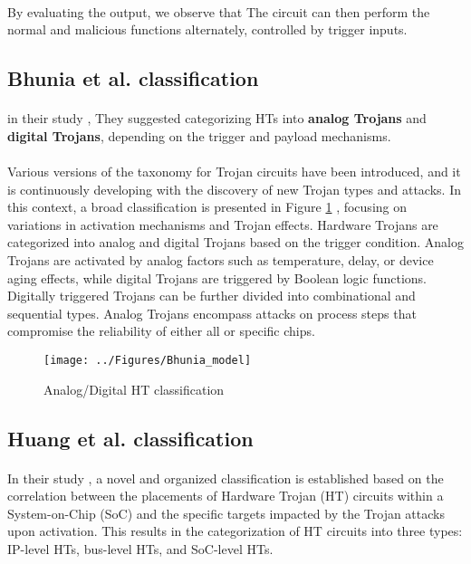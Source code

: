 \paragraph*{}
By evaluating the output, we observe that The circuit can then perform the normal and malicious functions alternately, controlled by trigger inputs.
\subsection{Bhunia et al. classification}
\paragraph*{}
in their study \cite{6856140}, They suggested categorizing HTs into \textbf{analog Trojans} and \textbf{digital Trojans}, depending on the trigger and payload mechanisms.
\paragraph*{}
Various versions of the taxonomy for Trojan circuits have been introduced, and it is continuously developing with the discovery of new Trojan types and attacks. In this context, a broad classification is presented in Figure \ref{fig:bhuniamodel} , focusing on variations in activation mechanisms and Trojan effects. Hardware Trojans are categorized into analog and digital Trojans based on the trigger condition. Analog Trojans are activated by analog factors such as temperature, delay, or device aging effects, while digital Trojans are triggered by Boolean logic functions. Digitally triggered Trojans can be further divided into combinational and sequential types. Analog Trojans encompass attacks on process steps that compromise the reliability of either all or specific chips.
\begin{figure}[h]
	\centering
	\texttt{[image: ../Figures/Bhunia\_model]}
	\caption{Analog/Digital HT classification}
	\label{fig:bhuniamodel}
\end{figure}
\subsection{Huang et al. classification}
\paragraph*{}
In their study \cite{8952724}, a novel and organized classification is established based on the correlation between the placements of Hardware Trojan (HT) circuits within a System-on-Chip (SoC) and the specific targets impacted by the Trojan attacks upon activation. This results in the categorization of HT circuits into three types: IP-level HTs, bus-level HTs, and  SoC-level HTs.


